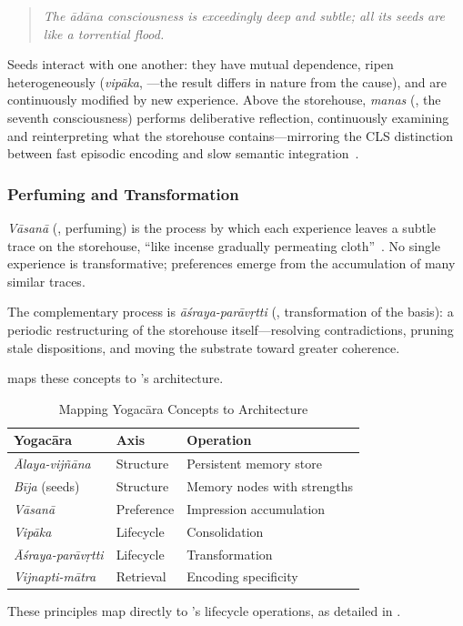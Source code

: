 \begin{quote}
\emph{The \=ad\=ana consciousness is exceedingly deep and subtle; all
its seeds are like a torrential flood.}
\end{quote}

Seeds interact with one another: they have mutual dependence, ripen
heterogeneously (\emph{vip\=aka}, ---the result differs in
nature from the cause), and are continuously modified by new experience.
Above the storehouse, \emph{manas} (, the seventh
consciousness) performs deliberative reflection, continuously examining
and reinterpreting what the storehouse contains---mirroring the CLS
distinction between fast episodic encoding and slow semantic
integration~\cite{mcclelland1995}.

\subsubsection{Perfuming and Transformation}

\emph{V\=asan\=a} (, perfuming) is the process by which each
experience leaves a subtle trace on the storehouse, ``like incense
gradually permeating cloth''~\cite{chengweishilun}.  No single
experience is transformative; preferences emerge from the accumulation
of many similar traces.

The complementary process is \emph{\=a\'sraya-par\=av\d{r}tti}
(, transformation of the basis): a periodic restructuring of
the storehouse itself---resolving contradictions, pruning stale
dispositions, and moving the substrate toward greater coherence.

 maps these concepts to \alaya{}'s
architecture.

\begin{table}[t]
\centering
\caption{Mapping Yogac\=ara Concepts to \alaya{} Architecture}
\label{tab:yogacara-mapping}
\begin{tabular}{@{}L{2.0cm}L{1.8cm}L{3.2cm}@{}}
\toprule
\textbf{Yogac\=ara} & \textbf{Axis} & \textbf{\alaya{} Operation} \\
\midrule
\emph{\=Alaya-vij\~n\=ana} & Structure & Persistent memory store \\
\emph{B\=ija} (seeds) & Structure & Memory nodes with strengths \\
\emph{V\=asan\=a} & Preference & Impression accumulation \\
\emph{Vip\=aka} & Lifecycle & Consolidation \\
\emph{\=A\'sraya-par\=av\d{r}tti} & Lifecycle & Transformation \\
\emph{Vijnapti-m\=atra} & Retrieval & Encoding specificity \\
\bottomrule
\end{tabular}
\end{table}

\noindent These principles map directly to \alaya{}'s lifecycle
operations, as detailed in .
